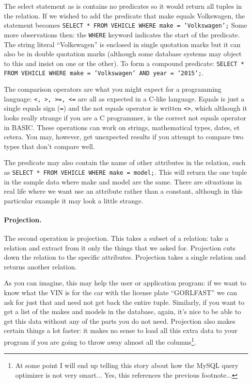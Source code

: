 The select statement as is contains no predicates so it would return all tuples in the relation. If we wished to add the predicate that make equals Volkswagen, the statement becomes \texttt{SELECT * FROM VEHICLE WHERE make = 'Volkswagen';} Some more observations then: the \texttt{WHERE} keyword indicates the start of the predicate. The string literal ``Volkswagen'' is enclosed in single quotation marks but it can also be in double quotation marks (although some database systems may object to this and insist on one or the other). To form a compound predicate: \texttt{SELECT * FROM VEHICLE WHERE make = 'Volkswagen' AND year = '2015';}. 

The comparison operators are what you might expect for a programming language: \texttt{<, >, >=, <=} are all as expected in a C-like language. Equals is just a single equals sign (\texttt{=}) and the not equals operator is written \texttt{<>}, which although it looks really strange if you are a C programmer, is the correct not equals operator in BASIC. These operations can work on strings, mathematical types, dates, et cetera. You may, however, get unexpected results if you attempt to compare two types that don't compare well.

The predicate may also contain the name of other attributes in the relation, such as \texttt{SELECT * FROM VEHICLE WHERE make = model;}. This will return the one tuple in the sample data where make and model are the same. There are situations in real life where we want use an attribute rather than a constant, although in this particular example it may look a little strange.

\paragraph{Projection.} The second operation is projection. This takes a subset of a relation: take a relation and extract from it only the things that we asked for. Projection cuts down the relation to the specific attributes. Projection takes a single relation and returns another relation.

As you can imagine, this may help the user or application program: if we want to know what the VIN is for the car with the license plate ``GORLFAST'' we can ask for just that and need not get back the entire tuple. Similarly, if you want to get a list of the makes and models in the database, again, it's nice to be able to get this data without any of the parts you do not need. Projection also makes certain things a lot faster: it makes no sense to load all this extra data to your program if you are going to throw away almost all the columns\footnote{At some point I will end up telling this story about how the MySQL query optimizer is not very smart... Yes, this references the previous footnote...}.

